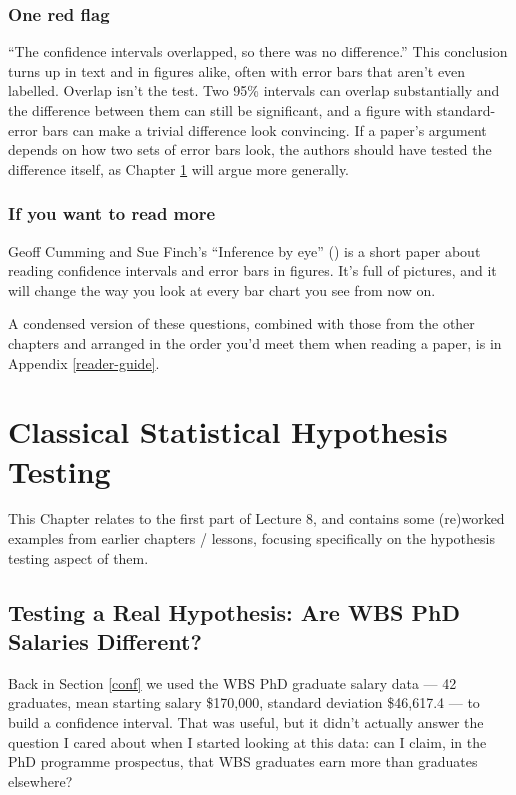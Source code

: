 \documentclass[
]{book}
\begin{document}
\subsection{One red flag}\label{one-red-flag-6}

``The confidence intervals overlapped, so there was no difference.'' This conclusion turns up in text and in figures alike, often with error bars that aren't even labelled. Overlap isn't the test. Two 95\% intervals can overlap substantially and the difference between them can still be significant, and a figure with standard-error bars can make a trivial difference look convincing. If a paper's argument depends on how two sets of error bars look, the authors should have tested the difference itself, as Chapter \ref{H-testing} will argue more generally.

\subsection{If you want to read more}\label{if-you-want-to-read-more-6}

Geoff Cumming and Sue Finch's ``Inference by eye'' () is a short paper about reading confidence intervals and error bars in figures. It's full of pictures, and it will change the way you look at every bar chart you see from now on.

A condensed version of these questions, combined with those from the other chapters and arranged in the order you'd meet them when reading a paper, is in Appendix \ref{reader-guide}.

\chapter{Classical Statistical Hypothesis Testing}\label{H-testing}

This Chapter relates to the first part of Lecture 8, and contains some (re)worked examples from earlier chapters / lessons, focusing specifically on the hypothesis testing aspect of them.

\section{Testing a Real Hypothesis: Are WBS PhD Salaries Different?}\label{salary-ztest}

Back in Section \ref{conf} we used the WBS PhD graduate salary data --- 42 graduates, mean starting salary \$170,000, standard deviation \$46,617.4 --- to build a confidence interval. That was useful, but it didn't actually answer the question I cared about when I started looking at this data: can I claim, in the PhD programme prospectus, that WBS graduates earn more than graduates elsewhere?
\end{document}
